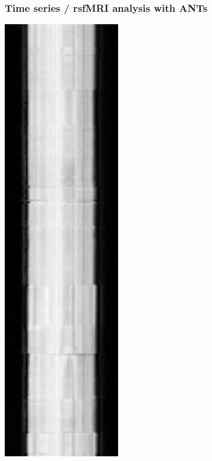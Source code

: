 \documentclass[18pt]{beamer}
\begin{document}
\begin{frame}
\frametitle{Time series / rsfMRI analysis with ANTs}
\includegraphics[width=2in]{../figures/rsfmri_discon.jpg}

\end{frame}
\end{document}
